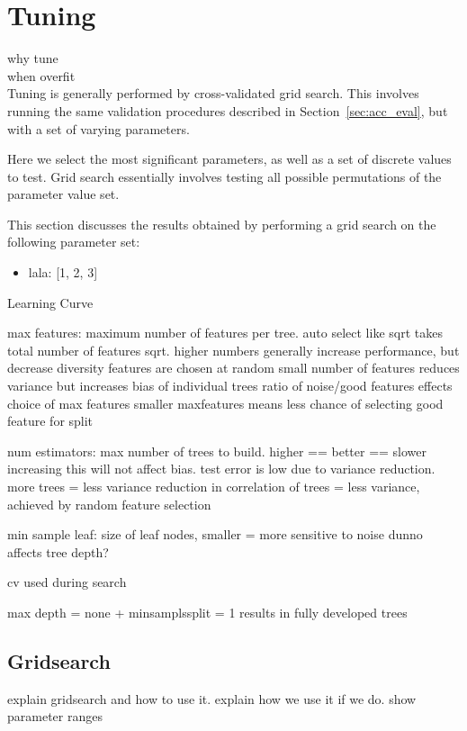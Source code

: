 \section{Tuning}\label{sec:tuning}
why tune\\

when overfit\\


Tuning is generally performed by cross-validated grid search.
This involves running the same validation procedures described in
Section~\ref{sec:acc_eval}, but with a set of varying parameters.

Here we select the most significant parameters, as well as a set of discrete
values to test.
Grid search essentially involves testing all possible permutations of the
parameter value set.

This section discusses the results obtained by performing a grid search on
the following parameter set:
\begin{itemize}
  \item lala: [1, 2, 3]
\end{itemize}

Learning Curve

max features: maximum number of features per tree. auto select like sqrt takes 
total number of features sqrt.
higher numbers generally increase performance, but decrease diversity
features are chosen at random
small number of features reduces variance but increases bias of individual trees
ratio of noise/good features effects choice of max features
smaller maxfeatures means less chance of selecting good feature for split

num estimators: max number of trees to build. higher == better == slower
increasing this will not affect bias. test error is low due to variance reduction.
more trees = less variance
reduction in correlation of trees = less variance, achieved by random feature
selection

min sample leaf: size of leaf nodes, smaller = more sensitive to noise
dunno
affects tree depth?


cv used during search

max depth = none + minsamplssplit = 1 results in fully developed trees




\subsection{Gridsearch}
explain gridsearch and how to use it.
explain how we use it if we do.
show parameter ranges


